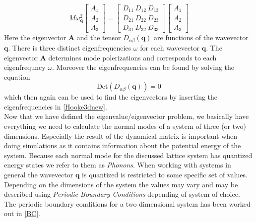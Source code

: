 \begin{equation}
    M\omega_{\mathbf{q}}^{2}\begin{bmatrix}
           A_{1} \\
           A_{2} \\
           A_{3}
         \end{bmatrix}=\begin{bmatrix}
           D_{11} \ D_{12} \ D_{13}\\
           D_{21} \ D_{22} \ D_{23}\\
           D_{31} \ D_{32} \ D_{33}
         \end{bmatrix}\begin{bmatrix}
           A_{1} \\
           A_{2} \\
           A_{3}
         \end{bmatrix}
\end{equation} Here the eigenvector $\mathbf{A}$ and the tensor $D_{\alpha\beta}(\mathbf{q})$ are functions of the wavevector $\mathbf{q}$. There is three distinct eigenfrequencies $\omega$ for each wavevector $\mathbf{q}$. The eigenvector $\mathbf{A}$ determines mode polerizations and corresponds to each eigenfrequncy $\omega$. Moreover the eigenfrequencies can be found by solving the equation\begin{equation}
    \text{Det}(D_{\alpha\beta}(\mathbf{q}))=0 
\end{equation}which then again can be used to find the eigenvectors by inserting the eigenfrequencies in \cref{Hooke3dnew}. \\
Now that we have defined the eigenvalue/eigenvector problem, we basically have everything we need to calculate the normal modes of a system of three (or two) dimensions. Especially the result of the dynamical matrix is important when doing simulations as it contains information about the potential energy of the system. Because each normal mode for the discussed lattice system has quantized energy states we refer to them as \textit{Phonons}. When working with systems in general the wavevector $\mathbf{q}$ is quantized is restricted to some specific set of values. Depending on the dimensions of the system the values may vary and may be described using \textit{Periodic Boundary Conditions} depending of system of choice. The periodic boundary conditions for a two dimensional system has been worked out in \cref{BC}. 
 
